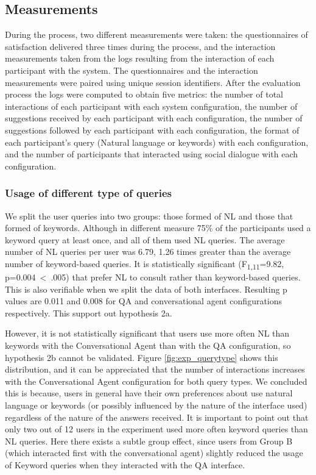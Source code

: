 \subsection{Measurements}

During the process, two different measurements were taken: the questionnaires of satisfaction delivered three times during the process, and the interaction measurements taken from the logs resulting from the interaction of each participant with the system. The questionnaires and the interaction measurements were paired using unique session identifiers. After the evaluation process the logs were computed to obtain five metrics: the number of total interactions of each participant with each system configuration, the number of suggestions received by each participant with each configuration, the number of suggestions followed by each participant with each configuration, the format of each participant's query (Natural language or keywords) with each configuration, and the number of participants that interacted using social dialogue with each configuration.

\subsubsection{Usage of different type of queries}

We split the user queries into two groups: those formed of \ac{NL} and those that formed of keywords. Although in different measure 75\% of the participants used a keyword query at least once, and all of them used \ac{NL} queries. The average number of \ac{NL} queries per user was 6.79, 1.26 times greater than the average number of keyword-based queries. It is statistically significant (F\textsubscript{1,11}=9.82, p=0.004~\textless~.005) that prefer \ac{NL} to consult rather than keyword-based queries. This is also verifiable when we split the data of both interfaces. Resulting p values are 0.011 and 0.008 for \ac{QA} and conversational agent configurations respectively. This support out hypothesis 2a.

However, it is not statistically significant that users use more often \ac{NL} than keywords with the Conversational Agent than with the \ac{QA} configuration, so hypothesis 2b cannot be validated. Figure \ref{fig:exp_querytype} shows this distribution, and it can be appreciated that the number of interactions increases with the Conversational Agent configuration for both query types. We concluded this is because, users in general have their own preferences about use natural language or keywords (or possibly influenced by the nature of the interface used) regardless of the nature of the answers received. It is important to point out that only two out of 12 users in the experiment used more often keyword queries than \ac{NL} queries. Here there exists a subtle group effect, since users from Group B (which interacted first with the conversational agent) slightly reduced the usage of Keyword queries when they interacted with the \ac{QA} interface.

